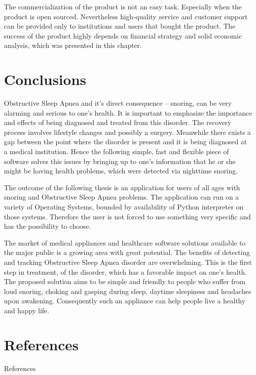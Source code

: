 \documentclass[12pt,a4paper]{report}
\begin{document}
The commercialization of the product is not an easy task. Especially when the product is open sourced. Nevertheless high-quality service and customer support can be provided only to institutions and users that bought the product. The success of the product highly depends on financial strategy and solid economic analysis, which was presented in this chapter.

\chapter*{Conclusions}
Obstructive Sleep Apnea and it's direct consequence -- snoring, can be very alarming and serious to one's health. It is important to emphasize the importance and effects of being diagnosed and treated from this disorder. The recovery process involves lifestyle changes and possibly a surgery. Meanwhile there exists a gap between the point where the disorder is present and it is being diagnosed at a medical institution. Hence the following simple, fast and flexible piece of software solves this issues by bringing up to one's information that he or she might be having health problems, which were detected via nighttime snoring.

The outcome of the following thesis is an application for users of all ages with snoring and Obstructive Sleep Apnea problems. The application can run on a variety of Operating Systems, bounded by availability of Python interpreter on those systems. Therefore the user is not forced to use something very specific and has the possibility to choose.

The market of medical appliances and healthcare software solutions available to the major public is a growing area with great potential. The benefits of detecting and tracking Obstructive Sleep Apnea disorder are overwhelming. This is the first step in treatment, of the disorder, which has a favorable impact on one's health. The proposed solution aims to be simple and friendly to people who suffer from loud snoring, choking and gasping during sleep, daytime sleepiness and headaches upon awakening. Consequently such an appliance can help people live a healthy and happy life.


\chapter*{References}
References
\end{document}
